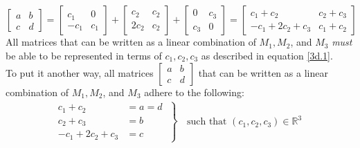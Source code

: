 \documentclass[]{article}
\newcommand{\reals}{\mathbb{R}}
\newcommand{\bmat}[1]{\begin{bmatrix}#1\end{bmatrix}}
\begin{document}
\subsection{}
\begin{equation}
	\label{3d.1}
	\bmat{a&b\\c&d} = \bmat{c_1 & 0\\-c_1 & c_1} + \bmat{c_2 & c_2\\2c_2 & c_2} + \bmat{0 & c_3\\c_3 & 0} = \bmat{c_1 + c_2 & c_2 + c_3\\-c_1 + 2c_2 + c_3 & c_1 + c_2}
\end{equation}
All matrices that can be written as a linear combination of $M_1, M_2$, and $M_3$ \emph{must} be able to be represented in terms of $c_1, c_2, c_3$ as described in equation \ref{3d.1}.\\
To put it another way, all matrices $\left[\begin{smallmatrix}a&b\\c&d\end{smallmatrix}\right]$ that can be written as a linear combination of $M_1, M_2$, and $M_3$ adhere to the following:
\begin{gather*}
	\left.
	\begin{aligned}
		c_1 + c_2 &= a = d \; \\
		c_2 + c_3 &= b\\
		-c_1 + 2c_2 + c_3 &= c
	\end{aligned}
	\right\}
	\begin{aligned}
		\\
		\;\; \text{such that }(c_1,c_2,c_3) \in \reals^3\\
		\;
	\end{aligned}
\end{gather*}
\begin{align*}
	\;
\end{align*}
\end{document}

